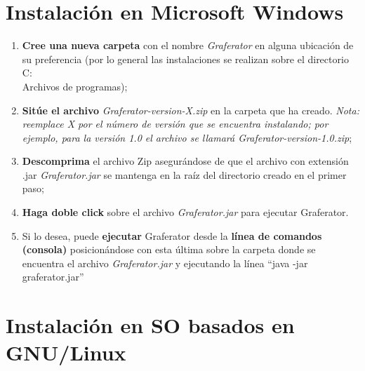 \documentclass{book}
\begin{document}
\section{Instalación en Microsoft Windows}

\begin{enumerate}
	\itemsep=8pt \topsep=0pt \partopsep=0pt \parskip=0pt \parsep=0pt
	
	\item \textbf{Cree una nueva carpeta} con el nombre \textit{Graferator} en alguna ubicación de su preferencia (por lo general las instalaciones se realizan sobre el directorio C:\\Archivos de programas);

	\item \textbf{Sitúe el archivo} \textit{Graferator-version-X.zip} en la carpeta que ha creado. \textit{Nota: reemplace X por el número de versión que se encuentra instalando; por ejemplo, para la versión 1.0 el archivo se llamará Graferator-version-1.0.zip};

	\item \textbf{Descomprima} el archivo Zip asegurándose de que el archivo con extensión .jar \textit{Graferator.jar} se mantenga en la raíz del directorio creado en el primer paso;

	\item \textbf{Haga doble click} sobre el archivo \textit{Graferator.jar} para ejecutar Graferator.

	\item Si lo desea, puede \textbf{ejecutar} Graferator desde la \textbf{línea de comandos (consola)} posicionándose con esta última sobre la carpeta donde se encuentra el archivo \textit{Graferator.jar} y ejecutando la línea ``{\ttfamily\footnotesize java -jar graferator.jar}''

\end{enumerate}
\bigskip



\section{Instalación en SO basados en GNU/Linux}
\end{document}
